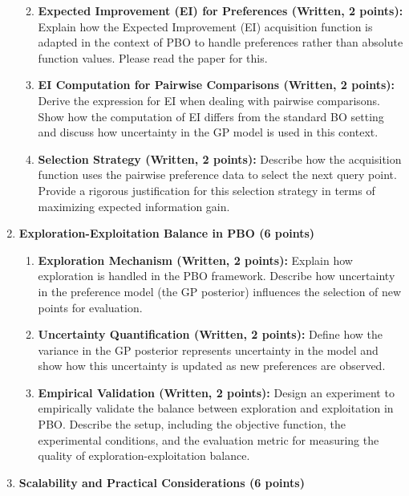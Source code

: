 \documentclass[
  letterpaper,
  numbers=noenddot,
  DIV=11]{scrreprt}
\theoremstyle{plain}
\theoremstyle{definition}
\theoremstyle{remark}
\begin{document}
\begin{enumerate}
  \begin{enumerate}
  \def\labelenumii{(\roman{enumii})}
  \item
    \textbf{Expected Improvement (EI) for Preferences (Written, 2
    points):} Explain how the Expected Improvement (EI) acquisition
    function is adapted in the context of PBO to handle preferences
    rather than absolute function values. Please read the paper for
    this.
  \item
    \textbf{EI Computation for Pairwise Comparisons (Written, 2
    points):} Derive the expression for EI when dealing with pairwise
    comparisons. Show how the computation of EI differs from the
    standard BO setting and discuss how uncertainty in the GP model is
    used in this context.
  \item
    \textbf{Selection Strategy (Written, 2 points):} Describe how the
    acquisition function uses the pairwise preference data to select the
    next query point. Provide a rigorous justification for this
    selection strategy in terms of maximizing expected information gain.
  \end{enumerate}
\item
  \textbf{Exploration-Exploitation Balance in PBO (6 points)}

  \begin{enumerate}
  \def\labelenumii{(\roman{enumii})}
  \item
    \textbf{Exploration Mechanism (Written, 2 points):} Explain how
    exploration is handled in the PBO framework. Describe how
    uncertainty in the preference model (the GP posterior) influences
    the selection of new points for evaluation.
  \item
    \textbf{Uncertainty Quantification (Written, 2 points):} Define how
    the variance in the GP posterior represents uncertainty in the model
    and show how this uncertainty is updated as new preferences are
    observed.
  \item
    \textbf{Empirical Validation (Written, 2 points):} Design an
    experiment to empirically validate the balance between exploration
    and exploitation in PBO. Describe the setup, including the objective
    function, the experimental conditions, and the evaluation metric for
    measuring the quality of exploration-exploitation balance.
  \end{enumerate}
\item
  \textbf{Scalability and Practical Considerations (6 points)}


\end{enumerate}
\end{document}
